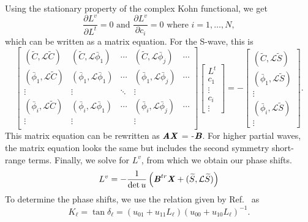 \documentclass[preprint,showpacs,preprintnumbers,amsmath,amssymb,longbibliography,pra,aps]{revtex4-1}
\newcommand{\beq}{\begin{equation}}
\newcommand{\eeq}{\end{equation}}
\begin{document}
Using the stationary property of the complex Kohn functional, we get
\beq
\frac{\partial L^v}{\partial L^t} = 0  \text{ and } \frac{\partial L^v}{\partial c_i} = 0 \text{ where $i = 1,\ldots,N$},
\label{eq:ComplexKohnStationary}
\eeq
which can be written as a matrix equation. For the S-wave, this is
\begin{equation}
\label{eq:ComplexKohnMatrix}
\begin{bmatrix} 
 (\widetilde{C},\mathcal{L}\widetilde{C}) & (\widetilde{C},\mathcal{L}\bar{\phi}_1) & \cdots & (\widetilde{C},\mathcal{L}\bar{\phi}_j) & \cdots\\
 (\bar{\phi}_1,\mathcal{L}\widetilde{C}) & (\bar{\phi}_1,\mathcal{L}\bar{\phi}_1) & \cdots & (\bar{\phi}_1,\mathcal{L}\bar{\phi}_j) & \cdots\\
 \vdots & \vdots & \ddots & \vdots \\
 (\bar{\phi}_i,\mathcal{L}\widetilde{C}) & (\bar{\phi}_i,\mathcal{L}\bar{\phi}_1) & \cdots & (\bar{\phi}_i,\mathcal{L}\bar{\phi}_j) & \cdots\\
 \vdots & \vdots & & \vdots & \\
\end{bmatrix}
\begin{bmatrix}
L^t\\
c_1\\
\vdots\\
c_i\\
\vdots
\end{bmatrix}
= -
\begin{bmatrix}
(\widetilde{C},\mathcal{L}\widetilde{S}) \\
(\bar{\phi}_1,\mathcal{L}\widetilde{S}) \\
\vdots \\
(\bar{\phi}_i,\mathcal{L}\widetilde{S}) \\
\vdots
\end{bmatrix}.
\end{equation}
This matrix equation can be rewritten as $\textbf{\emph{AX}}$ = -$\textbf{\emph{B}}$. For higher partial waves, the matrix equation looks the same but includes the second symmetry short-range terms. Finally, we solve for $L^v$, from which we obtain our phase shifts.
\begin{equation}
L^v = -\frac{1}{\det u} \left( \textbf{\emph{B}}^{tr} \textbf{\emph{X}} + (\widetilde{S},\mathcal{L} \widetilde{S}) \right)
\end{equation}
To determine the phase shifts, we use the relation given by Ref.~\cite{Lucchese1989} as
\begin{equation}
K_\ell = \tan \delta_\ell = (u_{01} + u_{11} L_\ell)(u_{00} + u_{10} L_\ell)^{-1}.
\end{equation}
\end{document}
